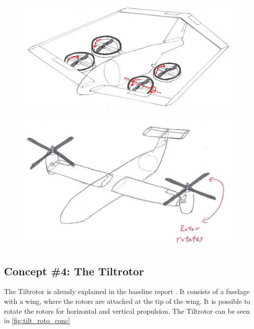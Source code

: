 \begin{figure}[htb]
\centering
\begin{minipage}{.5\textwidth}
    \centering
    \includegraphics[width = .95\linewidth]{Concepts/Figures/PrandtlBox}
    \label{fig:pran_box_conc}
\end{minipage}
\begin{minipage}{.49\textwidth}
    \centering
    \includegraphics[width=.95\linewidth]{Concepts/Figures/TiltRotor}
    \label{fig:tilt_roto_conc}    
\end{minipage}
\end{figure}




\subsection{Concept \#4: The Tiltrotor}
The Tiltrotor is already explained in the baseline report \cite{baseline}. It consists of a fuselage with a wing, where the rotors are attached at the tip of the wing. It is possible to rotate the rotors for horizontal and vertical propulsion. The Tiltrotor can be seen in \autoref{fig:tilt_roto_conc}

